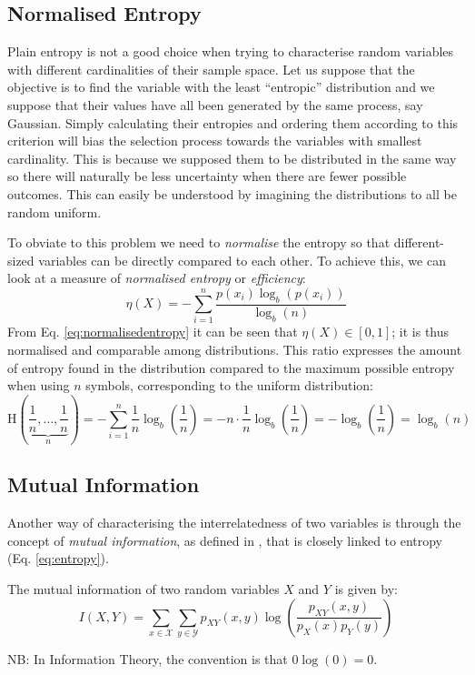 \subsection{Normalised Entropy} \label{subsec:normalised-entropy}
Plain entropy is not a good choice when trying to characterise random variables with different cardinalities of their sample space.
Let us suppose that the objective is to find the variable with the least \enquote{entropic} distribution and we suppose that their values have all been generated by the same process, say Gaussian.
Simply calculating their entropies and ordering them according to this criterion will bias the selection process towards the variables with smallest cardinality.
This is because we supposed them to be distributed in the same way so there will naturally be less uncertainty when there are fewer possible outcomes.
This can easily be understood by imagining the distributions to all be random uniform.

To obviate to this problem we need to \textit{normalise} the entropy so that different-sized variables can be directly compared to each other.
To achieve this, we can look at a measure of \textit{normalised entropy} or \textit{efficiency}:
\begin{equation} \label{eq:normalisedentropy}
 	\eta(X)=-\sum_{i=1}^{n} \frac{p\left(x_{i}\right) \log _{b}\left(p\left(x_{i}\right)\right)}{\log _{b}(n)}
\end{equation}
From Eq. \ref{eq:normalisedentropy} it can be seen that $\eta(X) \in [0,1]$; it is thus normalised and comparable among distributions.
This ratio expresses the amount of entropy found in the distribution compared to the maximum possible entropy when using $n$ symbols, corresponding to the uniform distribution:
\begin{equation}
\mathrm{H}\left(\underbrace{\frac{1}{n}, \ldots, \frac{1}{n}}_{n}\right) = - \sum_{i=1}^n \frac{1}{n} \log _{b} \left( \frac{1}{n} \right) = -n \cdot \frac{1}{n} \log _{b} \left( \frac{1}{n} \right) = - \log _{b} \left( \frac{1}{n} \right) = \log _{b}(n) 
\end{equation}   

\subsection{Mutual Information} \label{subsec:mutualinformation}
Another way of characterising the interrelatedness of two variables is through the concept of \textit{mutual information}, as defined in \cite{Cover2006}, that is closely linked to entropy (Eq. \ref{eq:entropy}).
\begin{definition}
	The mutual information of two random variables $X$ and $Y$ is given by:
	\begin{equation} \label{eq:mutual-information}
		I(X,Y) = \sum_{x \in \mathcal{X}} \sum_{y \in \mathcal{Y}} p_{XY}(x,y) \log \left( \frac{p_{XY}(x, y)}{p_{X}(x) p_{Y}(y)} \right)
	\end{equation}
\end{definition}
NB: In Information Theory, the convention is that $0 \log(0) = 0$.

